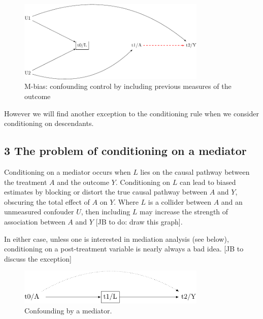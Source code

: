 \documentclass[
  singlecolumn]{report}
\begin{document}
\begin{figure}

{\centering \includegraphics[width=0.8\textwidth,height=\textheight]{causal-dags_files/figure-pdf/fig-m-bias-1.pdf}

}

\caption{\label{fig-m-bias}M-bias: confounding control by including
previous measures of the outcome}

\end{figure}

However we will find another exception to the conditioning rule when we
consider conditioning on descendants.

\hypertarget{the-problem-of-conditioning-on-a-mediator}{%
\subsection{3 The problem of conditioning on a
mediator}\label{the-problem-of-conditioning-on-a-mediator}}

Conditioning on a mediator occurs when \(L\) lies on the causal pathway
between the treatment \(A\) and the outcome \(Y\). Conditioning on \(L\)
can lead to biased estimates by blocking or distort the true causal
pathway between \(A\) and \(Y\), obscuring the total effect of \(A\) on
\(Y\). Where \(L\) is a collider between \(A\) and an unmeasured
confouder \(U\), then including \(L\) may increase the strength of
association between \(A\) and \(Y\) {[}JB to do: draw this graph{]}.

In either case, unless one is interested in mediation analysis (see
below), conditioning on a post-treatment variable is nearly always a bad
idea. {[}JB to discuss the exception{]}

\begin{figure}

{\centering \includegraphics[width=0.8\textwidth,height=\textheight]{causal-dags_files/figure-pdf/fig-dag-mediator-1.pdf}

}

\caption{\label{fig-dag-mediator}Confounding by a mediator.}

\end{figure}
\end{document}
